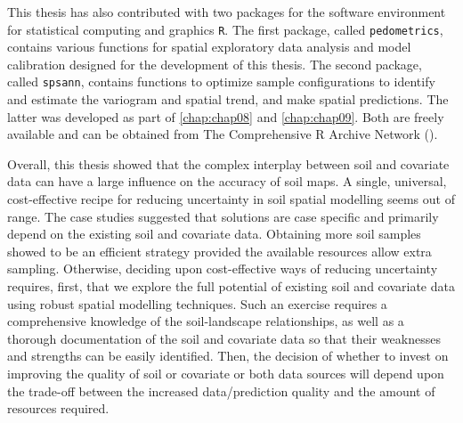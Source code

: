 This thesis has also contributed with two packages for the software environment for statistical computing and 
graphics \texttt{R}. The first package, called \texttt{pedometrics}, contains various functions for spatial 
exploratory data analysis and model calibration designed for the development of this thesis. The second 
package, called \texttt{spsann}, contains functions to optimize sample configurations to identify and estimate 
the variogram and spatial trend, and make spatial predictions. The latter was developed as part of 
\autoref{chap:chap08} and \autoref{chap:chap09}. Both are freely available and can be obtained from The 
Comprehensive R Archive Network (\cran).

Overall, this thesis showed that the complex interplay between soil and covariate data can have a large 
influence on the accuracy of soil maps. A single, universal, cost-effective recipe for reducing uncertainty 
in soil spatial modelling seems out of range. The case studies suggested that solutions are case specific and 
primarily depend on the existing soil and covariate data. Obtaining more soil samples showed to be an efficient 
strategy provided the available resources allow extra sampling. Otherwise, deciding upon cost-effective ways of 
reducing uncertainty requires, first, that we explore the full potential of existing soil and covariate 
data using robust spatial modelling techniques. Such an exercise requires a comprehensive knowledge of the 
soil-landscape relationships, as well as a thorough documentation of the soil and covariate data so that their 
weaknesses and strengths can be easily identified. Then, the decision of whether to invest on improving the 
quality of soil or covariate or both data sources will depend upon the trade-off between the increased 
data/prediction quality and the amount of resources required.
